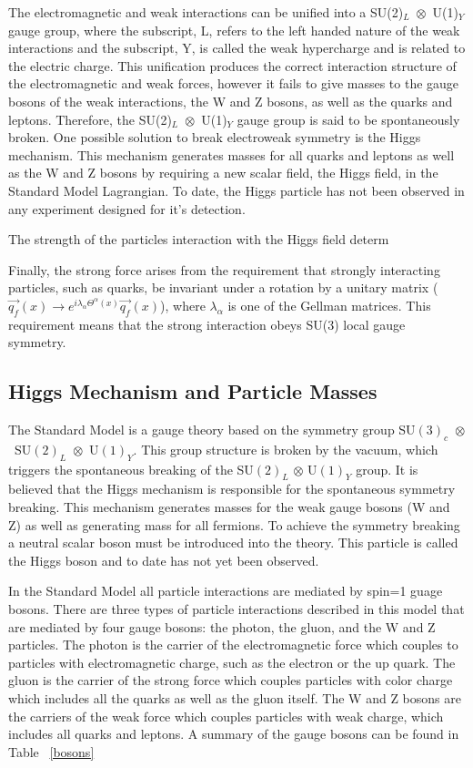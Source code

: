 The electromagnetic and weak interactions can be unified into a \mbox{SU(2)$_{L}$ $\otimes$ U(1)$_{Y}$} gauge group, where the subscript, L, refers to the left handed nature of the weak interactions and the subscript, Y, is called the weak hypercharge and is related to the electric charge. This unification produces the correct interaction structure of the electromagnetic and weak forces, however it fails to give masses to the gauge bosons of the weak interactions, the W and Z bosons, as well as the quarks and leptons. Therefore, the \mbox{SU(2)$_{L}$ $\otimes$ U(1)$_{Y}$} gauge group is said to be spontaneously broken. One possible solution to break electroweak symmetry is the Higgs mechanism. This mechanism generates masses for all quarks and leptons as well as the W and Z bosons by requiring a new scalar field, the Higgs field, in the Standard Model Lagrangian. To date, the Higgs particle has not been observed in any experiment designed for it's detection. 

The strength of the particles interaction with the Higgs field determ

Finally, the strong force arises from the requirement that strongly interacting particles, such as quarks, be invariant under a rotation by a unitary matrix (\mbox{$\vec{q_{f}}(x) \rightarrow e^{i\lambda_{\alpha}\Theta^{\alpha}(x)}\vec{q_{f}}(x)$}), where $\lambda_{\alpha}$ is one of the Gellman matrices. This requirement means that the strong interaction obeys SU(3) local gauge symmetry.



\subsection{Higgs Mechanism and Particle Masses}
The Standard Model is a gauge theory based on the symmetry group \mbox{SU$(3)_{c}$ $\otimes$ SU$(2)_{L}$ $\otimes$ U$(1)_{Y}$}. This group structure is broken by the vacuum, which triggers the spontaneous breaking of the SU$(2)_{L}$ $\otimes$ U$(1)_{Y}$ group. It is believed that the Higgs mechanism is responsible for the spontaneous symmetry breaking. This mechanism generates masses for the weak gauge bosons (W and Z) as well as generating mass for all fermions. To achieve the symmetry breaking a neutral scalar boson must be introduced into the theory. This particle is called the Higgs boson and to date has not yet been observed.

In the Standard Model all particle interactions are mediated by spin=1 guage bosons. There are three types of particle interactions described in this model that are mediated by four gauge bosons: the photon, the gluon, and the W and Z particles. The photon is the carrier of the electromagnetic force which couples to particles with electromagnetic charge, such as the electron or the up quark. The gluon is the carrier of the strong force which couples particles with color charge which includes all the quarks as well as the gluon itself. The W and Z bosons are the carriers of the weak force which couples particles with weak charge, which includes all quarks and leptons. A summary of the gauge bosons can be found in Table ~\ref{bosons}


